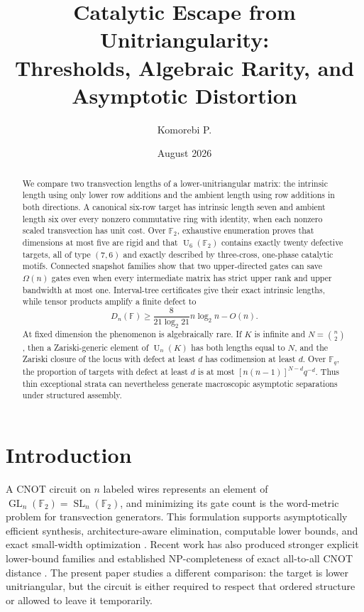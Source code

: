 \documentclass[11pt]{amsart}
\title[Catalytic escape from unitriangularity]{Catalytic Escape from Unitriangularity:\\Thresholds, Algebraic Rarity, and Asymptotic Distortion}
\author{Komorebi P.}
\date{August 2026}
\numberwithin{equation}{section}
\theoremstyle{definition}
\theoremstyle{remark}
\newcommand{\F}{\mathbb F}
\newcommand{\GL}{\operatorname{GL}}
\newcommand{\SL}{\operatorname{SL}}
\newcommand{\U}{\operatorname{U}}
\begin{document}
\begin{abstract}
We compare two transvection lengths of a lower-unitriangular matrix: the intrinsic length using only lower row additions and the ambient length using row additions in both directions.  A canonical six-row target has intrinsic length seven and ambient length six over every nonzero commutative ring with identity, when each nonzero scaled transvection has unit cost.  Over $\F_2$, exhaustive enumeration proves that dimensions at most five are rigid and that $\U_6(\F_2)$ contains exactly twenty defective targets, all of type $(7,6)$ and exactly described by three-cross, one-phase catalytic motifs.  Connected snapshot families show that two upper-directed gates can save $\Omega(n)$ gates even when every intermediate matrix has strict upper rank and upper bandwidth at most one.  Interval-tree certificates give their exact intrinsic lengths, while tensor products amplify a finite defect to
\[
D_n(\F)\ge \frac{8}{21\log_2 21}n\log_2 n-O(n).
\]
At fixed dimension the phenomenon is algebraically rare.  If $K$ is infinite and $N=\binom n2$, then a Zariski-generic element of $\U_n(K)$ has both lengths equal to $N$, and the Zariski closure of the locus with defect at least $d$ has codimension at least $d$.  Over $\F_q$, the proportion of targets with defect at least $d$ is at most $[n(n-1)]^{N-d}q^{-d}$.  Thus thin exceptional strata can nevertheless generate macroscopic asymptotic separations under structured assembly.
\end{abstract}

\maketitle

\section{Introduction}

A CNOT circuit on $n$ labeled wires represents an element of $\GL_n(\F_2)=\SL_n(\F_2)$, and minimizing its gate count is the word-metric problem for transvection generators.  This formulation supports asymptotically efficient synthesis, architecture-aware elimination, computable lower bounds, and exact small-width optimization \cite{SaeediMarkov2013,PatelMarkovHayes2008,JiangEtAl2020,GoubaultEtAl2021,Bataille2022,BuFanJoo2025,ChristensenEtAl2025,WebsterEtAl2025}.  Recent work has also produced stronger explicit lower-bound families and established NP-completeness of exact all-to-all CNOT distance \cite{Jorgensen2026,GongYu2026,AcuavivaEtAl2026}.  The present paper studies a different comparison: the target is lower unitriangular, but the circuit is either required to respect that ordered structure or allowed to leave it temporarily.
\end{document}
